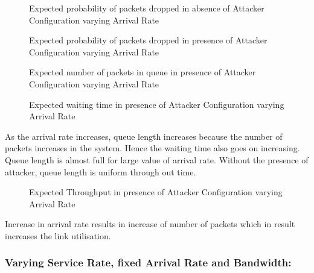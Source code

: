 \begin{figure}[H]
		\centering
		\caption{{Expected probability of packets dropped in absence of Attacker Configuration varying Arrival Rate}}
		\label{fig:figbb}
\end{figure}

\begin{figure}[H]
		\centering
		\caption{{Expected probability of packets dropped in presence of Attacker Configuration varying Arrival Rate}}
		\label{fig:figbc}
\end{figure}

\pagebreak

\begin{figure}[H]
		\centering
		\caption{{Expected number of packets in queue in presence of Attacker Configuration varying Arrival Rate}}
		\label{fig:figbd}
\end{figure}

\begin{figure}[H]
		\centering
		\caption{{Expected waiting time in presence of Attacker Configuration varying Arrival Rate}}
		\label{fig:figbe}
\end{figure}

As the arrival rate increases, queue length increases because the number of packets increases in the system. Hence the waiting time also goes on increasing. Queue length is almost full for large value of arrival rate. Without the presence of attacker, queue length is uniform through out time.

\pagebreak

\begin{figure}[H]
		\centering
		\caption{{Expected Throughput in presence of Attacker Configuration varying Arrival Rate}}
		\label{fig:figbf}
\end{figure}

Increase in arrival rate results in increase of number of packets which in result increases the link utilisation.
 
\subsubsection*{Varying Service Rate, fixed Arrival Rate and Bandwidth:}

